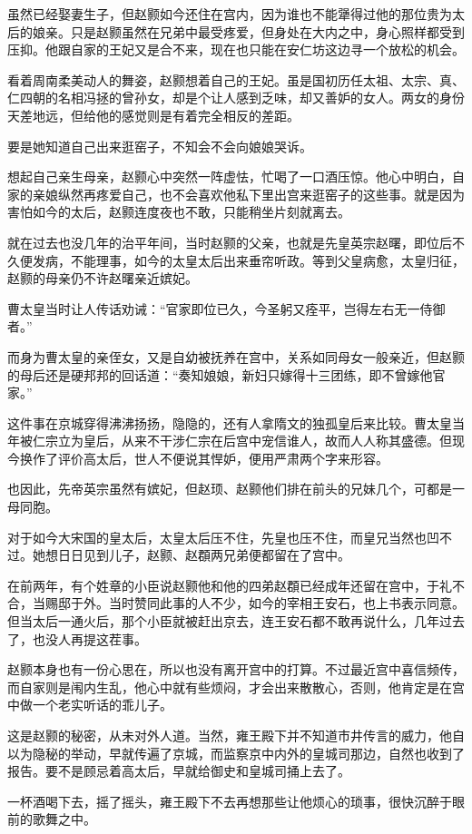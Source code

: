 虽然已经娶妻生子，但赵颢如今还住在宫内，因为谁也不能犟得过他的那位贵为太后的娘亲。只是赵颢虽然在兄弟中最受疼爱，但身处在大内之中，身心照样都受到压抑。他跟自家的王妃又是合不来，现在也只能在安仁坊这边寻一个放松的机会。

看着周南柔美动人的舞姿，赵颢想着自己的王妃。虽是国初历任太祖、太宗、真、仁四朝的名相冯拯的曾孙女，却是个让人感到乏味，却又善妒的女人。两女的身份天差地远，但给他的感觉则是有着完全相反的差距。

要是她知道自己出来逛窑子，不知会不会向娘娘哭诉。

想起自己亲生母亲，赵颢心中突然一阵虚怯，忙喝了一口酒压惊。他心中明白，自家的亲娘纵然再疼爱自己，也不会喜欢他私下里出宫来逛窑子的这些事。就是因为害怕如今的太后，赵颢连度夜也不敢，只能稍坐片刻就离去。

就在过去也没几年的治平年间，当时赵颢的父亲，也就是先皇英宗赵曙，即位后不久便发病，不能理事，如今的太皇太后出来垂帘听政。等到父皇病愈，太皇归征，赵颢的母亲仍不许赵曙亲近嫔妃。

曹太皇当时让人传话劝诫：“官家即位已久，今圣躬又痊平，岂得左右无一侍御者。”

而身为曹太皇的亲侄女，又是自幼被抚养在宫中，关系如同母女一般亲近，但赵颢的母后还是硬邦邦的回话道：“奏知娘娘，新妇只嫁得十三团练，即不曾嫁他官家。”

这件事在京城穿得沸沸扬扬，隐隐的，还有人拿隋文的独孤皇后来比较。曹太皇当年被仁宗立为皇后，从来不干涉仁宗在后宫中宠信谁人，故而人人称其盛德。但现今换作了评价高太后，世人不便说其悍妒，便用严肃两个字来形容。

也因此，先帝英宗虽然有嫔妃，但赵顼、赵颢他们排在前头的兄妹几个，可都是一母同胞。

对于如今大宋国的皇太后，太皇太后压不住，先皇也压不住，而皇兄当然也凹不过。她想日日见到儿子，赵颢、赵頵两兄弟便都留在了宫中。

在前两年，有个姓章的小臣说赵颢他和他的四弟赵頵已经成年还留在宫中，于礼不合，当赐邸于外。当时赞同此事的人不少，如今的宰相王安石，也上书表示同意。但当太后一通火后，那个小臣就被赶出京去，连王安石都不敢再说什么，几年过去了，也没人再提这茬事。

赵颢本身也有一份心思在，所以也没有离开宫中的打算。不过最近宫中喜信频传，而自家则是闱内生乱，他心中就有些烦闷，才会出来散散心，否则，他肯定是在宫中做一个老实听话的乖儿子。

这是赵颢的秘密，从未对外人道。当然，雍王殿下并不知道市井传言的威力，他自以为隐秘的举动，早就传遍了京城，而监察京中内外的皇城司那边，自然也收到了报告。要不是顾忌着高太后，早就给御史和皇城司捅上去了。

一杯酒喝下去，摇了摇头，雍王殿下不去再想那些让他烦心的琐事，很快沉醉于眼前的歌舞之中。

